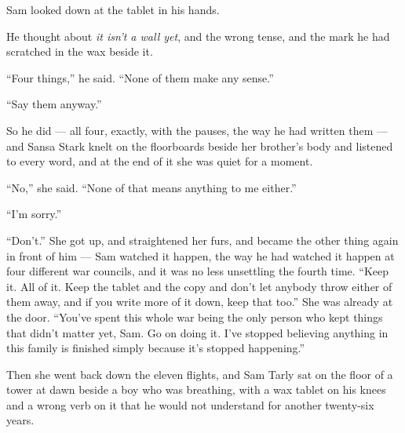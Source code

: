 Sam looked down at the tablet in his hands.

He thought about \textit{it isn’t a wall yet}, and the wrong tense, and the mark he had scratched in the wax beside it.

“Four things,” he said. “None of them make any sense.”

“Say them anyway.”

So he did — all four, exactly, with the pauses, the way he had written them — and Sansa Stark knelt on the floorboards beside her brother’s body and listened to every word, and at the end of it she was quiet for a moment.

“No,” she said. “None of that means anything to me either.”

“I’m sorry.”

“Don’t.” She got up, and straightened her furs, and became the other thing again in front of him — Sam watched it happen, the way he had watched it happen at four different war councils, and it was no less unsettling the fourth time. “Keep it. All of it. Keep the tablet and the copy and don’t let anybody throw either of them away, and if you write more of it down, keep that too.” She was already at the door. “You’ve spent this whole war being the only person who kept things that didn’t matter yet, Sam. Go on doing it. I’ve stopped believing anything in this family is finished simply because it’s stopped happening.”

Then she went back down the eleven flights, and Sam Tarly sat on the floor of a tower at dawn beside a boy who was breathing, with a wax tablet on his knees and a wrong verb on it that he would not understand for another twenty-six years.